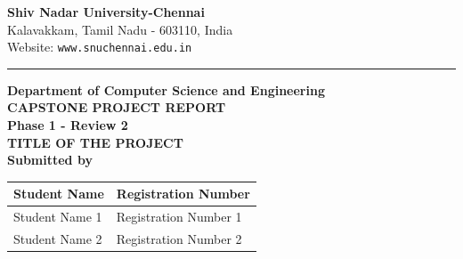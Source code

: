 \documentclass[12pt,a4paper]{report}
\begin{document}

\begin{titlepage}




\centering
{\large \textbf{Shiv Nadar University-Chennai}}\\[0.1cm]
{\normalsize Kalavakkam, Tamil Nadu - 603110, India}\\[0.1cm]
{\normalsize Website: \texttt{www.snuchennai.edu.in}}


\vspace{0.2cm}
\hrule

\begin{center}

{\large \textbf{Department of Computer Science and Engineering }}\\[1cm]

{\large \textbf{CAPSTONE PROJECT REPORT}}\\

{\large \textbf{Phase 1 - Review 2}}\\[1cm]


{\large \textbf{TITLE OF THE PROJECT}}\\[1cm]

{\large \textbf{Submitted by}}\\[0.3cm]

\begin{tabular}{p{6cm}p{5cm}}
\toprule
\centering \textbf{Student Name} &
\centering \arraybackslash \textbf{Registration Number}\\
\midrule
\centering Student Name 1 &
\centering \arraybackslash Registration Number 1\\
\centering Student Name 2 &
\centering \arraybackslash Registration Number 2\\
\bottomrule
\end{tabular}


\end{center}
\end{titlepage}
\end{document}
